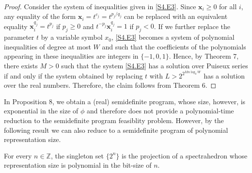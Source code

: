 \begin{proof}
Consider the system of inequalities given in \eqref{S4.E3}. Since $\bm{x}_{i}\geq 0$ for all $i$, any equality of the form $\bm{x}_{i}=t^{c_{j}}=t^{p_{j}/q_{j}}$ can be replaced with an equivalent equality $\bm{x}_{i}^{q_{j}}=t^{p_{j}}$ if $p_{j}\geq 0$ and $t^{-p_{j}}\bm{x}_{i}^{q_{j}}=1$ if $p_{j}<0$. If we further replace the parameter $t$ by a variable symbol $x_{0}$, \eqref{S4.E3} becomes a system of polynomial inequalities of degree at most $W$ and such that the coefficients of the polynomials appearing in these inequalities are integers in $\{-1,0,1\}$. Hence, by Theorem 7, there exists $M>0$ such that the system \eqref{S4.E3} has a solution over Puiseux series if and only if the system obtained by replacing $t$ with $L>2^{2^{Mn\log_{2}W}}$ has a solution over the real numbers. Therefore, the claim follows from Theorem 6. 

\end{proof}
In Proposition 8, we obtain a (real) semidefinite program, whose size, however, is exponential in the size of $\phi$ and therefore does not provide a polynomial-time reduction to the semidefinite program feasiblity problem. However, by the following result we can also reduce to a semidefinite program of polynomial representation size.

\setcounter{theorem}{8}
\begin{theorem}\label{Thmtheorem9}
For every $n\in{\mathbb{Z}}$, the singleton set $\{2^{n}\}$ is the projection of a spectrahedron whose representation size is polynomial in the bit-size of $n$.

\end{theorem}

